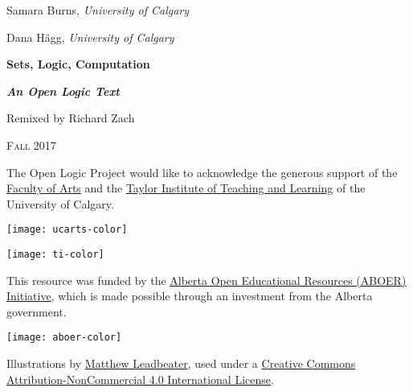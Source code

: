 Samara Burns, \emph{University of Calgary}

Dana H\"agg, \emph{University of Calgary}

\newpage


\vspace*{100pt}

\begin{raggedleft}

{\fontsize{24pt}{24pt}\selectfont\bfseries\sffamily%
  Sets, Logic, Computation}

\smallskip

{\fontsize{18pt}{18pt}\selectfont\bfseries\itshape An Open Logic Text}

\vspace{100pt}

\fontsize{14pt}{14pt}\selectfont Remixed by Richard Zach

\vfill

\textsc{Fall 2017}%

\end{raggedleft}


\newpage


\noindent
The Open Logic Project would like to acknowledge the generous support
of the \href{http://arts.ucalgary.ca/}{Faculty of Arts} and
the \href{http://www.ucalgary.ca/taylorinstitute/}{Taylor Institute of
Teaching and Learning} of the University of Calgary.

\bigskip

\noindent\texttt{[image: ucarts-color]}

\medskip

\noindent\texttt{[image: ti-color]}

\bigskip\noindent
This resource was funded by the \href{http://albertaoer.com}{Alberta
Open Educational Resources (ABOER) Initiative}, which is made possible
through an investment from the Alberta government.

\noindent\texttt{[image: aboer-color]}

\vfill


\noindent Illustrations by \href{http://mattleadbeater.com}{Matthew
  Leadbeater}, used under a
\href{http://creativecommons.org/licenses/by-nc/4.0/}{Creative Commons
  Attribution-NonCommercial 4.0 International License}.

\vfill


